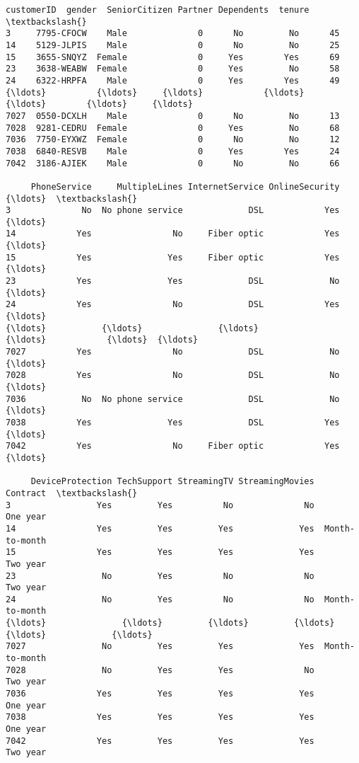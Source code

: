 \documentclass[11pt]{article}
\makeatletter
\newcommand{\boxspacing}{\kern\kvtcb@left@rule\kern\kvtcb@boxsep}
\newcommand{\prompt}[4]{
        {\ttfamily\llap{{\color{#2}[#3]:\hspace{3pt}#4}}\vspace{-\baselineskip}}
    }
\makeatother
\begin{document}
            \begin{tcolorbox}[breakable, size=fbox, boxrule=.5pt, pad at break*=1mm, opacityfill=0]
\prompt{Out}{outcolor}{13}{\boxspacing}
\begin{Verbatim}[commandchars=\\\{\}]
      customerID  gender  SeniorCitizen Partner Dependents  tenure  \textbackslash{}
3     7795-CFOCW    Male              0      No         No      45
14    5129-JLPIS    Male              0      No         No      25
15    3655-SNQYZ  Female              0     Yes        Yes      69
23    3638-WEABW  Female              0     Yes         No      58
24    6322-HRPFA    Male              0     Yes        Yes      49
{\ldots}          {\ldots}     {\ldots}            {\ldots}     {\ldots}        {\ldots}     {\ldots}
7027  0550-DCXLH    Male              0      No         No      13
7028  9281-CEDRU  Female              0     Yes         No      68
7036  7750-EYXWZ  Female              0      No         No      12
7038  6840-RESVB    Male              0     Yes        Yes      24
7042  3186-AJIEK    Male              0      No         No      66

     PhoneService     MultipleLines InternetService OnlineSecurity  {\ldots}  \textbackslash{}
3              No  No phone service             DSL            Yes  {\ldots}
14            Yes                No     Fiber optic            Yes  {\ldots}
15            Yes               Yes     Fiber optic            Yes  {\ldots}
23            Yes               Yes             DSL             No  {\ldots}
24            Yes                No             DSL            Yes  {\ldots}
{\ldots}           {\ldots}               {\ldots}             {\ldots}            {\ldots}  {\ldots}
7027          Yes                No             DSL             No  {\ldots}
7028          Yes                No             DSL             No  {\ldots}
7036           No  No phone service             DSL             No  {\ldots}
7038          Yes               Yes             DSL            Yes  {\ldots}
7042          Yes                No     Fiber optic            Yes  {\ldots}

     DeviceProtection TechSupport StreamingTV StreamingMovies        Contract  \textbackslash{}
3                 Yes         Yes          No              No        One year
14                Yes         Yes         Yes             Yes  Month-to-month
15                Yes         Yes         Yes             Yes        Two year
23                 No         Yes          No              No        Two year
24                 No         Yes          No              No  Month-to-month
{\ldots}               {\ldots}         {\ldots}         {\ldots}             {\ldots}             {\ldots}
7027               No         Yes         Yes             Yes  Month-to-month
7028               No         Yes         Yes              No        Two year
7036              Yes         Yes         Yes             Yes        One year
7038              Yes         Yes         Yes             Yes        One year
7042              Yes         Yes         Yes             Yes        Two year


\end{Verbatim}
\end{tcolorbox}
\end{document}
